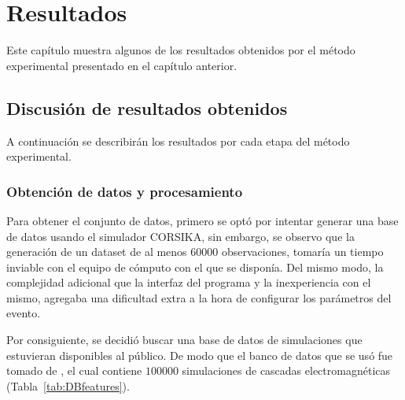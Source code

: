 
\chapter{Resultados} %

\label{Chapter5} %


Este capítulo muestra algunos de los resultados obtenidos por el método experimental presentado en el capítulo anterior.

\section{Discusión de resultados obtenidos}

A continuación se describirán los resultados por cada etapa del método experimental.

\subsection*{Obtención de datos y procesamiento}

Para obtener el conjunto de datos, primero se optó por intentar generar una base de datos usando el simulador CORSIKA, sin embargo, se observo que la generación de un dataset de al menos $60000$ observaciones, tomaría un tiempo inviable con el equipo de cómputo con el que se disponía. Del mismo modo, la complejidad adicional que la interfaz del programa y la inexperiencia con el mismo, agregaba una dificultad extra a la hora de configurar los parámetros del evento. 

Por consiguiente, se decidió buscar una base de datos de simulaciones que estuvieran disponibles al público. De modo que el banco de datos que se usó fue tomado de \parencite{Erdmann2018b}, el cual contiene $100000$ simulaciones de cascadas electromagnéticas (Tabla~\ref{tab:DBfeatures}).

